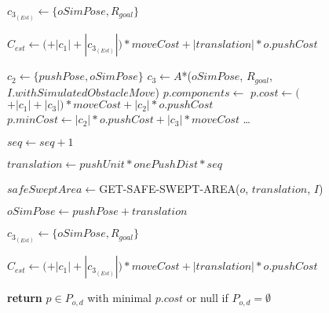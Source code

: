 \begin{algorithm}[H]
\begin{algorithmic}[1]
        \State $c_{3_{(Est)}} \gets \{oSimPose, R_{goal}\}$

        \State $C_{est} \gets ($$ + |c_{1}| + |c_{3_{(Est)}}|) * moveCost + |translation| * o.pushCost$


            \State $c_{2} \gets \{pushPose, oSimPose\}$
            \State $c_{3} \gets A$*($oSimPose$, $R_{goal}$, $I.withSimulatedObstacleMove$)
              \State $p.components \gets$ 
              \State $p.cost \gets ($$ + |c_{1}| + |c_{3}|) * moveCost + |c_{2}| * o.pushCost$
              \State $p.minCost \gets |c_{2}| * o.pushCost + |c_{3}| * moveCost$
              \State \dots {}
            \EndIf

          \State $seq \gets seq + 1$

          \State $translation \gets pushUnit * onePushDist * seq$

          \State $safeSweptArea \gets $GET-SAFE-SWEPT-AREA($o$, $translation$, $I$)

          \State $oSimPose \gets pushPose + translation$

          \State $c_{3_{(Est)}} \gets \{oSimPose, R_{goal}\}$

          \State $C_{est} \gets ($$ + |c_{1}| + |c_{3_{(Est)}}|) * moveCost + |translation| * o.pushCost$

        \EndWhile

      \EndFor

    \State \textbf{return} $p \in P_{o,d}$ with minimal $p.cost$ or null if $P_{o,d} = \emptyset$

    \EndProcedure

  \end{algorithmic}
\end{algorithm}
